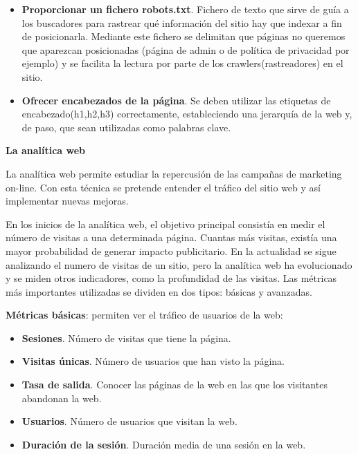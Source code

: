\begin{itemize}
\item \textbf{Proporcionar un fichero robots.txt}. Fichero de texto que sirve de guía a los buscadores para rastrear  qué información del sitio hay que indexar a fin de posicionarla. Mediante este fichero se delimitan que páginas no queremos que aparezcan posicionadas (página de admin o de política de privacidad por ejemplo) y se facilita la lectura por parte de los crawlers(rastreadores) en el sitio.

\item \textbf{Ofrecer encabezados de la página}. Se deben utilizar las etiquetas de encabezado(h1,h2,h3) correctamente, estableciendo una jerarquía de la web y, de paso, que sean utilizadas como palabras clave.


\end{itemize}

\vspace{5 mm}

\textbf{La analítica web}

\vspace{5 mm}

La analítica web permite estudiar la repercusión de las campañas de marketing on-line. Con esta técnica se pretende entender el tráfico del sitio web y así implementar nuevas mejoras.

\vspace{5 mm}

En los inicios de la analítica web, el objetivo principal consistía en medir el número de visitas a una determinada página. Cuantas más visitas, existía una mayor probabilidad de generar impacto publicitario. En la actualidad se sigue analizando el numero de visitas de un sitio, pero la analítica web ha evolucionado y se miden otros indicadores, como la profundidad de las visitas. Las métricas más importantes utilizadas se dividen en dos tipos: básicas y avanzadas.


\textbf{Métricas básicas}: permiten ver el tráfico de usuarios de la web:

\begin{itemize}

\item \textbf{Sesiones}. Número de visitas que tiene la página.

\item \textbf{Visitas únicas}. Número de usuarios que han visto la página.

\item \textbf{Tasa de salida}. Conocer las páginas de la web en las que los visitantes abandonan la web.

\item \textbf{Usuarios}. Número de usuarios que visitan la web.

\item \textbf{Duración de la sesión}. Duración media de una sesión en la web.

\end{itemize}

